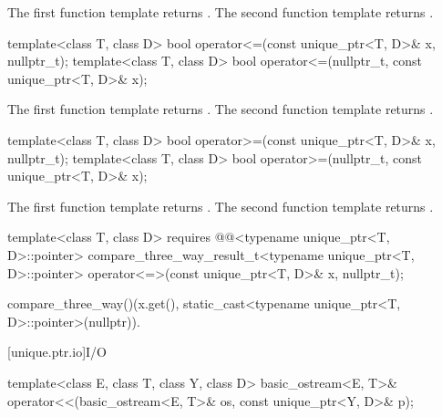 \begin{itemdescr}
\pnum
\returns
The first function template returns .
The second function template returns .
\end{itemdescr}

%
\begin{itemdecl}
template<class T, class D>
  bool operator<=(const unique_ptr<T, D>& x, nullptr_t);
template<class T, class D>
  bool operator<=(nullptr_t, const unique_ptr<T, D>& x);
\end{itemdecl}

\begin{itemdescr}
\pnum
\returns
The first function template returns .
The second function template returns .
\end{itemdescr}

%
\begin{itemdecl}
template<class T, class D>
  bool operator>=(const unique_ptr<T, D>& x, nullptr_t);
template<class T, class D>
  bool operator>=(nullptr_t, const unique_ptr<T, D>& x);
\end{itemdecl}

\begin{itemdescr}
\pnum
\returns
The first function template returns .
The second function template returns .
\end{itemdescr}

%
\begin{itemdecl}
template<class T, class D>
  requires @@<typename unique_ptr<T, D>::pointer>
  compare_three_way_result_t<typename unique_ptr<T, D>::pointer>
    operator<=>(const unique_ptr<T, D>& x, nullptr_t);
\end{itemdecl}

\begin{itemdescr}
\pnum
\returns
\begin{codeblock}
compare_three_way()(x.get(), static_cast<typename unique_ptr<T, D>::pointer>(nullptr)).
\end{codeblock}
\end{itemdescr}

[unique.ptr.io]{I/O}

%
\begin{itemdecl}
template<class E, class T, class Y, class D>
  basic_ostream<E, T>& operator<<(basic_ostream<E, T>& os, const unique_ptr<Y, D>& p);
\end{itemdecl}

